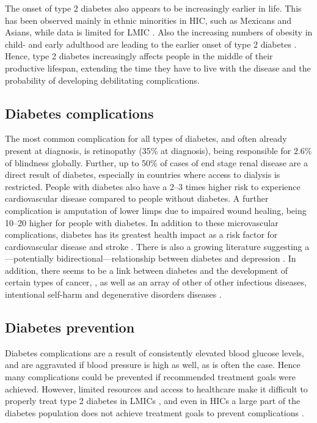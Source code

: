 The onset of type 2 diabetes also appears to be increasingly earlier in life. This has been observed mainly in ethnic minorities in \acs{HIC}, such as Mexicans and Asians, while data is limited for \ac{LMIC} \parencite{FazeliFarsani2013}. Also the increasing numbers of obesity in child- and early adulthood are leading to the earlier onset of type 2 diabetes \parencite{Chen2012}. Hence, type 2 diabetes increasingly affects people in the middle of their productive lifespan, extending the time they have to live with the disease and the probability of developing debilitating complications.

\subsection{Diabetes complications}

The most common complication for all types of diabetes, and often already present at diagnosis, is retinopathy (35\% at diagnosis), being responsible for 2.6\% of blindness globally. Further, up to 50\% of cases of end stage renal disease are a direct result of diabetes, especially in countries where access to dialysis is restricted. People with diabetes also have a 2--3 times higher risk to experience cardiovascular disease compared to people without diabetes. A further complication is amputation of lower limps due to impaired wound healing, being 10--20 higher for people with diabetes. In addition to these microvascular complications, diabetes has its greatest health impact as a risk factor for cardiovascular disease and stroke \parencite{WorldHealthOrganization2016}. There is also a growing literature suggesting a---potentially bidirectional---relationship between diabetes and depression \parencite{VanDooren2013,Nouwen2010,Roy2012}. In addition, there seems to be a link between diabetes and the development of certain types of cancer, \parencite{Tsilidis2015,Nead2015}, as well as an array of other of other infectious diseases, intentional self-harm and degenerative disorders diseases \parencite{Seshasai2011}.


\subsection{Diabetes prevention}

Diabetes complications are a result of consistently elevated blood glucose levels, and  are aggravated if blood pressure is high as well, as is often the case. Hence many complications could be prevented if recommended treatment goals were achieved. However, limited resources and access to healthcare make it difficult to properly treat type 2 diabetes in \acp{LMIC} \parencite{Villalpando2010}, and even in \acp{HIC} a large part of the diabetes population does not achieve treatment goals to prevent complications \parencite{DiabetesUK2012}. 

